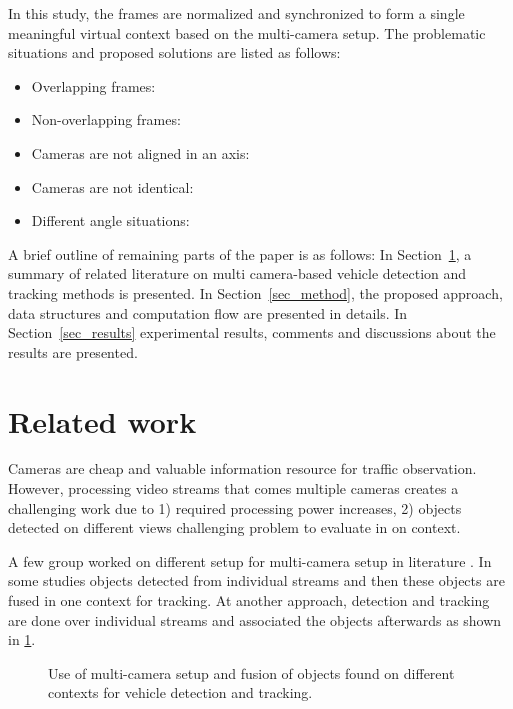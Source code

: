 \documentclass[5p,twocolumn,english]{elsarticle}
\begin{document}
In this study, the frames are normalized and synchronized to form a single meaningful virtual context based on the multi-camera setup. The problematic situations and proposed solutions are listed as follows:
\begin{itemize}
	\item Overlapping frames:
	\item Non-overlapping frames:
	\item Cameras are not aligned in an axis:
	\item Cameras are not identical:
	\item Different angle situations:
\end{itemize}  

A brief outline of remaining parts of the paper is as follows: In Section~\ref{sec_related}, a summary of related literature on multi camera-based vehicle detection and tracking methods is presented.  In Section~\ref{sec_method}, the proposed approach, data structures and computation flow are presented in details.  In Section~\ref{sec_results} experimental results, comments and discussions about the results are presented.

\section{Related work}
\label{sec_related}

Cameras are cheap and valuable information resource for traffic observation. However, processing video streams that comes multiple cameras creates a challenging work due to 1) required processing power increases, 2) objects detected on different views challenging problem to evaluate in on context.



A few group worked on different setup for multi-camera setup in literature \cite{olagoke}. In some studies objects detected from individual streams and then these objects are fused in one context for tracking. At another approach, detection and tracking are done over individual streams and associated the objects afterwards as shown in \ref{fig2}.

\begin{figure}[t]
	\centering
	\caption{Use of multi-camera setup and fusion of objects found on different contexts for vehicle detection and tracking.}
	\label{fig2}
\end{figure}
\end{document}
